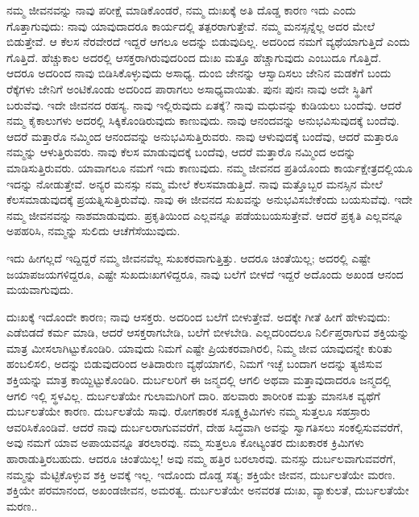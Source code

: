 ನಮ್ಮ ಜೀವನವನ್ನು ನಾವು ಪರೀಕ್ಷೆ ಮಾಡಿಕೊಂಡರೆ, ನಮ್ಮ ದುಃಖಕ್ಕೆ ಅತಿ ದೊಡ್ಡ ಕಾರಣ ಇದು ಎಂದು ಗೊತ್ತಾಗುವುದು: ನಾವು ಯಾವುದಾದರೂ ಕಾರ್ಯದಲ್ಲಿ ತತ್ಪರರಾಗುತ್ತೇವೆ. ನಮ್ಮ ಮನಸ್ಸನ್ನೆಲ್ಲ ಅದರ ಮೇಲೆ ಬಿಡುತ್ತೇವೆ. ಆ ಕೆಲಸ ನೆರವೇರದೆ ಇದ್ದರೆ ಆಗಲೂ ಅದನ್ನು ಬಿಡುವುದಿಲ್ಲ. ಅದರಿಂದ ನಮಗೆ ವ್ಯಥೆಯಾಗುತ್ತಿದೆ ಎಂದು ಗೊತ್ತಿದೆ. ಹೆಚ್ಚುಕಾಲ ಅದರಲ್ಲಿ ಆಸಕ್ತರಾಗಿರುವುದರಿಂದ ದುಃಖ ಮತ್ತೂ ಹೆಚ್ಚಾಗುವುದು ಎಂಬುದೂ ಗೊತ್ತಿದೆ. ಆದರೂ ಅದರಿಂದ ನಾವು ಬಿಡಿಸಿಕೊಳ್ಳುವುದು ಅಸಾಧ್ಯ. ದುಂಬಿ ಜೇನನ್ನು ಆಸ್ವಾದಿಸಲು ಜೇನಿನ ಮಡಕೆಗೆ ಬಂದು ರೆಕ್ಕೆಗಳು ಜೇನಿಗೆ ಅಂಟಿಕೊಂಡು ಅದರಿಂದ ಪಾರಾಗಲು ಅಸಾಧ್ಯವಾಯಿತು. ಪುನಃ ಪುನಃ ನಾವು ಅದೇ ಸ್ಥಿತಿಗೆ ಬರುವೆವು. ಇದೇ ಜೀವನದ ರಹಸ್ಯ. ನಾವು ಇಲ್ಲಿರುವುದು ಏತಕ್ಕೆ? ನಾವು ಮಧುವನ್ನು ಕುಡಿಯಲು ಬಂದೆವು. ಆದರೆ ನಮ್ಮ ಕೈಕಾಲುಗಳು ಅದರಲ್ಲಿ ಸಿಕ್ಕಿಕೊಂಡಿರುವುದು ಕಾಣುವುದು. ನಾವು ಆನಂದವನ್ನು ಅನುಭವಿಸುವುದಕ್ಕೆ ಬಂದೆವು. ಆದರೆ ಮತ್ತಾರೊ ನಮ್ಮಿಂದ ಆನಂದವನ್ನು ಅನುಭವಿಸುತ್ತಿರುವರು. ನಾವು ಆಳುವುದಕ್ಕೆ ಬಂದೆವು, ಆದರೆ ಮತ್ತಾರೂ ನಮ್ಮನ್ನು ಆಳುತ್ತಿರುವರು. ನಾವು ಕೆಲಸ ಮಾಡುವುದಕ್ಕೆ ಬಂದೆವು, ಆದರೆ ಮತ್ತಾರೊ ನಮ್ಮಿಂದ ಅದನ್ನು ಮಾಡಿಸುತ್ತಿರುವರು. ಯಾವಾಗಲೂ ನಮಗೆ ಇದು ಕಾಣುವುದು. ನಮ್ಮ ಜೀವನದ ಪ್ರತಿಯೊಂದು ಕಾರ್ಯಕ್ಷೇತ್ರದಲ್ಲಿಯೂ ಇದನ್ನು ನೋಡುತ್ತೇವೆ. ಅನ್ಯರ ಮನಸ್ಸು ನಮ್ಮ ಮೇಲೆ ಕೆಲಸಮಾಡುತ್ತಿದೆ. ನಾವು ಮತ್ತೊಬ್ಬರ ಮನಸ್ಸಿನ ಮೇಲೆ ಕೆಲಸಮಾಡುವುದಕ್ಕೆ ಪ್ರಯತ್ನಿಸುತ್ತಿರುವೆವು. ನಾವು ಈ ಜೀವನದ ಸುಖವನ್ನು ಅನುಭವಿಸಬೇಕೆಂದು ಬಯಸುವೆವು. ಇದೇ ನಮ್ಮ ಜೀವನವನ್ನು ನಾಶಮಾಡುವುದು. ಪ್ರಕೃತಿಯಿಂದ ಎಲ್ಲವನ್ನೂ ಪಡೆಯಬಯಸುತ್ತೇವೆ. ಆದರೆ ಪ್ರಕೃತಿ ಎಲ್ಲವನ್ನೂ ಅಪಹರಿಸಿ, ನಮ್ಮನ್ನು ಸುಲಿದು ಆಚೆಗೆಸೆಯುವುದು.

ಇದು ಹೀಗಲ್ಲದೆ ಇದ್ದಿದ್ದರೆ ನಮ್ಮ ಜೀವನವೆಲ್ಲ ಸುಖಕರವಾಗುತ್ತಿತ್ತು. ಆದರೂ ಚಿಂತೆಯಿಲ್ಲ; ಅದರಲ್ಲಿ ಎಷ್ಟೇ ಜಯಾಪಜಯಗಳಿದ್ದರೂ, ಎಷ್ಟೇ ಸುಖದುಃಖಗಳಿದ್ದರೂ, ನಾವು ಬಲೆಗೆ ಬೀಳದೆ ಇದ್ದರೆ ಅದೊಂದು ಅಖಂಡ ಆನಂದ ಮಯವಾಗುವುದು.

ದುಃಖಕ್ಕೆ ಇದೊಂದೇ ಕಾರಣ; ನಾವು ಆಸಕ್ತರು. ಅದರಿಂದ ಬಲೆಗೆ ಬೀಳುತ್ತೇವೆ. ಅದಕ್ಕೇ ಗೀತೆ ಹೀಗೆ ಹೇಳುವುದು: ಎಡೆಬಿಡದೆ ಕರ್ಮ ಮಾಡಿ, ಆದರೆ ಆಸಕ್ತರಾಗಬೇಡಿ, ಬಲೆಗೆ ಬೀಳಬೇಡಿ. ಎಲ್ಲದರಿಂದಲೂ ನಿರ್ಲಿಪ್ತರಾಗುವ ಶಕ್ತಿಯನ್ನು ಮಾತ್ರ ಮೀಸಲಾಗಿಟ್ಟುಕೊಂಡಿರಿ. ಯಾವುದು ನಿಮಗೆ ಎಷ್ಟೇ ಪ್ರಿಯಕರವಾಗಿರಲಿ, ನಿಮ್ಮ ಜೀವ ಯಾವುದನ್ನೇ ಕುರಿತು ಹಂಬಲಿಸಲಿ, ಅದನ್ನು ಬಿಡುವುದರಿಂದ ಅತಿದಾರುಣ ವ್ಯಥೆಯಾಗಲಿ, ನಿಮಗೆ ಇಚ್ಛೆ ಬಂದಾಗ ಅದನ್ನು ತ್ಯಜಿಸುವ ಶಕ್ತಿಯನ್ನು ಮಾತ್ರ ಕಾಯ್ದಿಟ್ಟುಕೊಂಡಿರಿ. ದುರ್ಬಲರಿಗೆ ಈ ಜನ್ಮದಲ್ಲಿ ಆಗಲಿ ಅಥವಾ ಮತ್ತಾವುದಾದರೂ ಜನ್ಮದಲ್ಲಿ ಆಗಲಿ ಇಲ್ಲಿ ಸ್ಥಳವಿಲ್ಲ. ದುರ್ಬಲತೆಯೇ ಗುಲಾಮಗಿರಿಗೆ ದಾರಿ. ಹಲವಾರು ಶಾರೀರಿಕ ಮತ್ತು ಮಾನಸಿಕ ವ್ಯಥೆಗೆ ದುರ್ಬಲತೆಯೇ ಕಾರಣ. ದುರ್ಬಲತೆಯೆ ಸಾವು. ರೋಗಕಾರಕ ಸೂಕ್ಷ್ಮಕ್ರಿಮಿಗಳು ನಮ್ಮ ಸುತ್ತಲೂ ಸಹಸ್ರಾರು ಆವರಿಸಿಕೊಂಡಿವೆ. ಆದರೆ ನಾವು ದುರ್ಬಲರಾಗುವವರೆಗೆ, ದೇಹ ಸಿದ್ಧವಾಗಿ ಅವನ್ನು ಸ್ವಾಗತಿಸಲು ಸಂಕಲ್ಪಿಸುವವರೆಗೆ, ಅವು ನಮಗೆ ಯಾವ ಅಪಾಯವನ್ನೂ ತರಲಾರವು. ನಮ್ಮ ಸುತ್ತಲೂ ಕೋಟ್ಯಂತರ ದುಃಖಕಾರಕ ಕ್ರಿಮಿಗಳು ಹಾರಾಡುತ್ತಿರಬಹುದು. ಆದರೂ ಚಿಂತೆಯಿಲ್ಲ! ಅವು ನಮ್ಮ ಹತ್ತಿರ ಬರಲಾರವು. ಮನಸ್ಸು ದುರ್ಬಲವಾಗುವವರೆಗೆ, ನಮ್ಮನ್ನು ಮೆಟ್ಟಿಕೊಳ್ಳುವ ಶಕ್ತಿ ಅವಕ್ಕೆ ಇಲ್ಲ. ಇದೊಂದು ದೊಡ್ಡ ಸತ್ಯ; ಶಕ್ತಿಯೇ ಜೀವನ, ದುರ್ಬಲತೆಯೇ ಮರಣ. ಶಕ್ತಿಯೇ ಪರಮಾನಂದ, ಅಖಂಡಜೀವನ, ಅಮರತ್ವ. ದುರ್ಬಲತೆಯೇ ಅನವರತ ದುಃಖ, ವ್ಯಾಕುಲತೆ, ದುರ್ಬಲತೆಯೇ ಮರಣ..

\vskip 2pt

